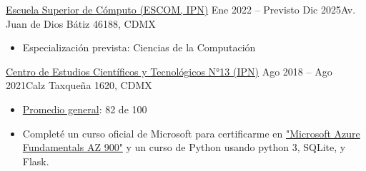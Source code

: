 \documentclass[10pt,a4paper,ragged2e,withhyper]{altacv}
\begin{document}
\begin{paracol}{2}

  {\href{https://es.wikipedia.org/wiki/Escuela_Superior_de_Cómputo}
  {Escuela Superior de Cómputo (\color{blue}ESCOM, IPN\color{black})}}
  {Ene 2022 -- Previsto Dic 2025}{Av. Juan de Dios Bátiz 46188, CDMX}
  \begin{itemize}
    \item Especialización prevista: Ciencias de la Computación
  \end{itemize}
  \divider
  {{\href{https://www.cecyt13.ipn.mx}
  {Centro de Estudios Científicos y Tecnológicos N°13 (\color{blue}IPN\color{black})}}}
  {Ago 2018 -- Ago 2021}{Calz Taxqueña 1620, CDMX}
  \begin{itemize}
    \item {\href{https://drive.google.com/file/d/1osz7QmjWUH6OcZ8AOrqVXEIJf-Pet3Q5/view?usp=sharing}{\color{blue}Promedio
    general\color{black}}}: 82 de 100
  \end{itemize}
  \divider
  \begin{itemize}
    \item Completé un curso oficial de Microsoft para certificarme en
    {\href{https://drive.google.com/file/d/1iRQRtXmNAItFIWmfjOP1m_35C4pAPpTP/view?usp=sharing}{\color{blue}"Microsoft
    Azure Fundamentals AZ 900"\color{black}}} y un curso de Python usando python
    3, SQLite, y Flask.
  \end{itemize}

  \switchcolumn

  \\
  \\
  \\
  \\


\end{paracol}
\end{document}
